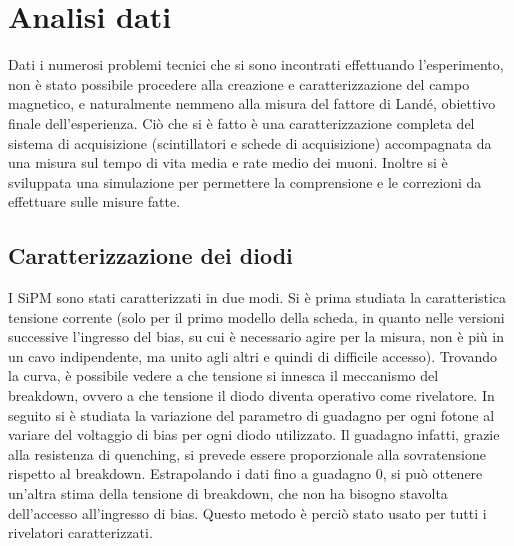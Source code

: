 \section{Analisi dati}
Dati i numerosi problemi tecnici che si sono incontrati effettuando l'esperimento, non è stato possibile procedere alla creazione e caratterizzazione del campo magnetico, e naturalmente nemmeno alla misura del fattore di Landé, obiettivo finale dell'esperienza. Ciò che si è fatto è una caratterizzazione completa del sistema di acquisizione (scintillatori e schede di acquisizione) accompagnata da una misura sul tempo di vita media e rate medio dei muoni. Inoltre si è sviluppata una simulazione per permettere la comprensione e le correzioni da effettuare sulle misure fatte.

\subsection{Caratterizzazione dei diodi}
I SiPM sono stati caratterizzati in due modi. Si è prima studiata la caratteristica tensione corrente (solo per il primo modello della scheda, in quanto nelle versioni successive l'ingresso del bias, su cui \`e necessario agire per la misura, non \`e pi\`u in un cavo indipendente, ma unito agli altri e quindi di difficile accesso). Trovando la curva, \`e possibile vedere a che tensione si innesca il meccanismo del breakdown, ovvero a che tensione il diodo diventa operativo come rivelatore.
In seguito si è studiata la variazione del parametro di guadagno per ogni fotone al variare del voltaggio di bias per ogni diodo utilizzato. Il guadagno infatti, grazie alla resistenza di quenching, si prevede essere proporzionale alla sovratensione rispetto al breakdown. Estrapolando i dati fino a guadagno 0, si pu\`o ottenere un'altra stima della tensione di breakdown, che non ha bisogno stavolta dell'accesso all'ingresso di bias. Questo metodo è perciò stato usato per tutti i rivelatori caratterizzati.


